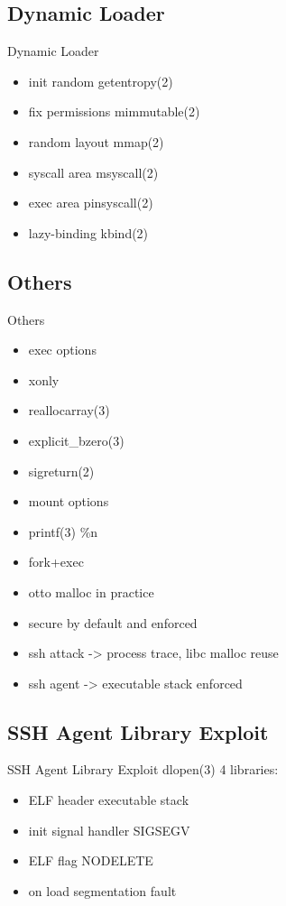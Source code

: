 \documentclass[14pt,aspectratio=169]{beamer}
\begin{document}
\subsection{Dynamic Loader}
\begin{frame}{Dynamic Loader}
\begin{itemize}
  \item init random getentropy(2)
  \item fix permissions mimmutable(2)
  \item random layout mmap(2)
  \item syscall area msyscall(2)
  \item exec area pinsyscall(2)
  \item lazy-binding kbind(2)
\end{itemize}
\end{frame}

\subsection{Others}
\begin{frame}{Others}
\begin{itemize}
  \item exec options
  \item xonly
  \item reallocarray(3)
  \item explicit\_bzero(3)
  \item sigreturn(2)
  \item mount options
  \item printf(3) \%n
  \item fork+exec
  \item otto malloc in practice
  \item secure by default and enforced
  \item ssh attack -> process trace, libc malloc reuse
  \item ssh agent -> executable stack enforced
\end{itemize}
\end{frame}

\subsection{SSH Agent Library Exploit}
\begin{frame}{SSH Agent Library Exploit}
dlopen(3) 4 libraries:
\begin{itemize}
  \item ELF header executable stack 
  \item init signal handler SIGSEGV
  \item ELF flag NODELETE
  \item on load segmentation fault
\end{itemize}
\end{frame}
\end{document}

